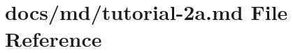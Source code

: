 \hypertarget{tutorial-2a_8md}{}\section{docs/md/tutorial-\/2a.md File Reference}
\label{tutorial-2a_8md}

